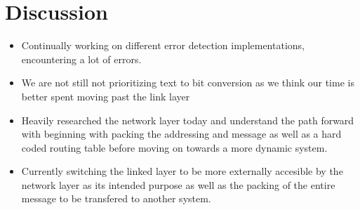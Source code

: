 \documentclass{article}
\begin{document}
\section*{Discussion}
\begin{itemize}
\item Continually working on different error detection implementations, encountering a lot of errors.
\item We are not still not prioritizing text to bit conversion as we think our time is better spent moving past the link layer
\item Heavily researched the network layer today and understand the path forward with beginning with packing the addressing and message as well as a hard coded routing table before moving on towards a more dynamic system.
\item Currently switching the linked layer to be more externally accesible by the network layer as its intended purpose as well as the packing of the entire message to be transfered to another system. 
\end{itemize}
\end{document}
